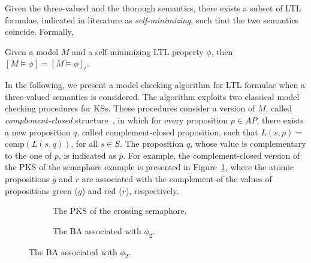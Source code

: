 Given the three-valued and the thorough semantics, there exists a subset of LTL formulae, indicated in literature as \emph{self-minimizing}, such that the two semantics coincide. Formally,

\begin{proposition}
\label{def:self-minimizing}
 Given a model $M$ and a  self-minimizing LTL property $\phi$, then $[M\models\phi]=[M\models\phi]_t$.
\end{proposition}
%
%

In the following, we present a model checking algorithm for LTL formulae when a three-valued semantics is considered. 
The algorithm exploits two classical model checking procedures for KSs.
These procedures consider a version of $M$, called \emph{complement-closed} structure~\cite{bruns2000model}, in which for every proposition $p \in AP$, there exists a new proposition $q$, called complement-closed proposition, such that $L(s,p)=$ comp$(L(s,q))$, for all $s \in S$.
The proposition $q$, whose value is complementary to the one of $p$, is indicated as $\overline{p}$.
For example, the complement-closed version of the PKS of the semaphore example is presented in Figure~\ref{fig:model}, where the atomic propositions $\overline{g}$ and $\overline{r}$ are associated with the complement of the values of  propositions green ($g$) and red ($r$), respectively.

\begin{figure}[t]
\begin{minipage}[b]{.5\textwidth}
  \begin{figure}[H]
 \centering

\caption{The PKS of  the  crossing semaphore.}
\label{fig:model}
\end{figure}
\end{minipage}
\begin{minipage}[b]{.5\textwidth}
  \begin{figure}[H]
\centering

\caption{The BA associated with $\phi_2$.}
\label{fig:property}
\end{figure}
\end{minipage}
\end{figure}



